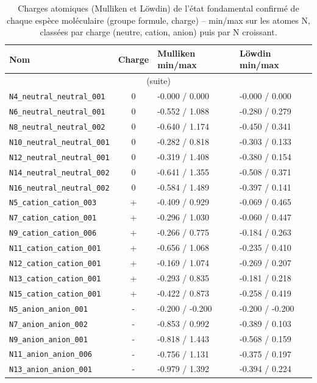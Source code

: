 {\scriptsize
\begin{longtable}{@{}p{4.6cm}cp{2.4cm}p{2.4cm}@{}}
\caption{Charges atomiques (Mulliken et L\"owdin) de l'\'etat fondamental confirm\'e de chaque esp\`ece mol\'eculaire (groupe formule, charge) -- min/max sur les atomes N, class\'ees par charge (neutre, cation, anion) puis par N croissant.}
\label{tab:charges}\\
\toprule
\textbf{Nom} & \textbf{Charge} & \textbf{Mulliken min/max} & \textbf{L\"owdin min/max} \\
\midrule\endfirsthead
\multicolumn{4}{c}{\small (suite)}\\ \toprule\endhead
\bottomrule\endfoot
\bottomrule\endlastfoot
\addlinespace
\texttt{N4\_neutral\_neutral\_001} & 0 & -0.000 / 0.000 & -0.000 / 0.000 \\
\texttt{N6\_neutral\_neutral\_001} & 0 & -0.552 / 1.088 & -0.280 / 0.279 \\
\texttt{N8\_neutral\_neutral\_002} & 0 & -0.640 / 1.174 & -0.450 / 0.341 \\
\texttt{N10\_neutral\_neutral\_001} & 0 & -0.282 / 0.818 & -0.303 / 0.133 \\
\texttt{N12\_neutral\_neutral\_001} & 0 & -0.319 / 1.408 & -0.380 / 0.154 \\
\texttt{N14\_neutral\_neutral\_002} & 0 & -0.641 / 1.355 & -0.508 / 0.371 \\
\texttt{N16\_neutral\_neutral\_002} & 0 & -0.584 / 1.489 & -0.397 / 0.141 \\
\addlinespace
\texttt{N5\_cation\_cation\_003} & + & -0.409 / 0.929 & -0.069 / 0.465 \\
\texttt{N7\_cation\_cation\_001} & + & -0.296 / 1.030 & -0.060 / 0.447 \\
\texttt{N9\_cation\_cation\_006} & + & -0.266 / 0.775 & -0.184 / 0.263 \\
\texttt{N11\_cation\_cation\_001} & + & -0.656 / 1.068 & -0.235 / 0.410 \\
\texttt{N12\_cation\_cation\_001} & + & -0.169 / 1.074 & -0.269 / 0.207 \\
\texttt{N13\_cation\_cation\_001} & + & -0.293 / 0.835 & -0.181 / 0.218 \\
\texttt{N15\_cation\_cation\_001} & + & -0.422 / 0.873 & -0.258 / 0.419 \\
\addlinespace
\texttt{N5\_anion\_anion\_001} & - & -0.200 / -0.200 & -0.200 / -0.200 \\
\texttt{N7\_anion\_anion\_002} & - & -0.853 / 0.992 & -0.389 / 0.103 \\
\texttt{N9\_anion\_anion\_001} & - & -0.818 / 1.443 & -0.568 / 0.159 \\
\texttt{N11\_anion\_anion\_006} & - & -0.756 / 1.131 & -0.375 / 0.197 \\
\texttt{N13\_anion\_anion\_001} & - & -0.979 / 1.392 & -0.394 / 0.224 \\
\end{longtable}
}